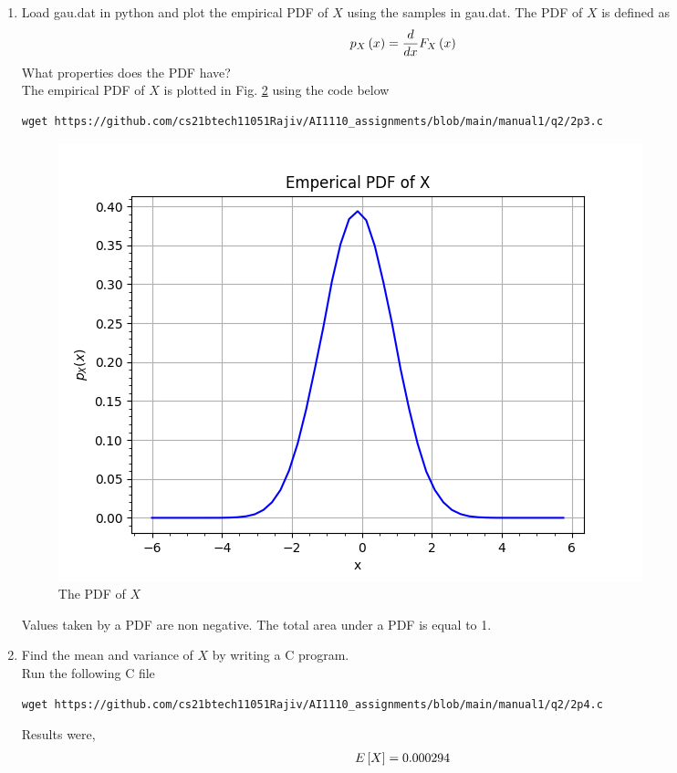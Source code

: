 \documentclass[journal,12pt,twocolumn]{IEEEtran}
\renewcommand\thesection{\arabic{section}}
\begin{document}
\begin{enumerate}[label=\thesection.\arabic*
,ref=\thesection.\theenumi]
\begin{figure}[ht!]
\label{fig:gauss_cdf}
\end{figure}
A CDF is a non-decreasing function. 
Its value varies from 0 to 1.
It is continuous if PDF has finite values.
%
\item
Load gau.dat in python and plot the empirical PDF of $X$ using the samples in gau.dat. The PDF of $X$ is defined as
\begin{align}
p_{X}\left(x\right) = \frac{d}{dx}F_{X}\left(x\right)
\label{eq:pdf_cdf}
\end{align}
What properties does the PDF have?
\\
\solution The empirical PDF of $X$ is plotted in Fig. \ref{fig:gauss_pdf} using the code below
\begin{lstlisting}
wget https://github.com/cs21btech11051Rajiv/AI1110_assignments/blob/main/manual1/q2/2p3.c
\end{lstlisting}
\begin{figure}[ht!]
\centering
\includegraphics[width=\columnwidth]{./figs/fig2.3.png}
\caption{The PDF of $X$}
\label{fig:gauss_pdf}
\end{figure}
Values taken by a PDF are non negative. The total area under a PDF is equal to 1. 
%
\item Find the mean and variance of $X$ by writing a C program.
\\
\solution Run the following C file
\begin{lstlisting}
wget https://github.com/cs21btech11051Rajiv/AI1110_assignments/blob/main/manual1/q2/2p4.c
\end{lstlisting}
Results were, 
\begin{align}
E\sbrak{X}  = 0.000294 \\

\end{align}
\end{enumerate}
\end{document}
